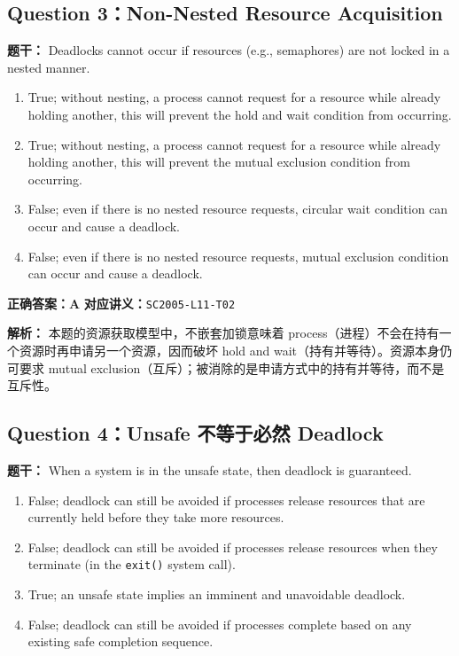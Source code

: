 \documentclass[11pt,a4paper,fontset=fandol]{ctexart}
\renewcommand{\exercisequestion}[2]{%
  \Needspace{5\baselineskip}%
  \subsection{#2}\label{exercise:#1}%
}
\renewenvironment{checkedsolution}
  {\par\nopagebreak[4]\textbf{解析：}\ignorespaces}
  {\par}
\begin{document}
\exercisequestion{SC2005-HW04-Q03}{Question 3：Non-Nested Resource Acquisition}

\textbf{题干：} Deadlocks cannot occur if resources (e.g., semaphores) are not locked in a nested manner.

\begin{enumerate}[label=\Alph*.,leftmargin=2.4em]
  \item True; without nesting, a process cannot request for a resource while already holding another, this will prevent the hold and wait condition from occurring.
  \item True; without nesting, a process cannot request for a resource while already holding another, this will prevent the mutual exclusion condition from occurring.
  \item False; even if there is no nested resource requests, circular wait condition can occur and cause a deadlock.
  \item False; even if there is no nested resource requests, mutual exclusion condition can occur and cause a deadlock.
\end{enumerate}

\textbf{正确答案：A}\qquad
\textbf{对应讲义：}\texttt{SC2005-L11-T02}

\begin{checkedsolution}
本题的资源获取模型中，不嵌套加锁意味着 process（进程）不会在持有一个资源时再申请另一个资源，因而破坏 hold and wait（持有并等待）。资源本身仍可要求 mutual exclusion（互斥）；被消除的是申请方式中的持有并等待，而不是互斥性。
\end{checkedsolution}

\exercisequestion{SC2005-HW04-Q04}{Question 4：Unsafe 不等于必然 Deadlock}

\textbf{题干：} When a system is in the unsafe state, then deadlock is guaranteed.

\begin{enumerate}[label=\Alph*.,leftmargin=2.4em]
  \item False; deadlock can still be avoided if processes release resources that are currently held before they take more resources.
  \item False; deadlock can still be avoided if processes release resources when they terminate (in the \texttt{exit()} system call).
  \item True; an unsafe state implies an imminent and unavoidable deadlock.
  \item False; deadlock can still be avoided if processes complete based on any existing safe completion sequence.
\end{enumerate}
\end{document}
